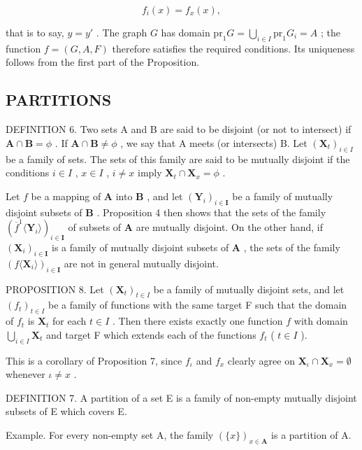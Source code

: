 \[
f _ {i} (x) = f _ {x} (x),
\]

that is to say, \(y = y'\) . The graph \(G\) has domain \(\mathrm{pr}_1 G = \bigcup_{i \in I} \mathrm{pr}_1 G_i = A\) ; the function \(f = (G, A, F)\) therefore satisfies the required conditions. Its uniqueness follows from the first part of the Proposition.

\subsection{PARTITIONS}

DEFINITION 6. Two sets A and B are said to be disjoint (or not to intersect) if \(\mathbf{A} \cap \mathbf{B} = \phi\) . If \(\mathbf{A} \cap \mathbf{B} \neq \phi\) , we say that A meets (or intersects) B. Let \((\mathbf{X}_{t})_{i \in I}\) be a family of sets. The sets of this family are said to be mutually disjoint if the conditions \(i \in I\) , \(x \in I\) , \(i \neq x\) imply \(\mathbf{X}_{t} \cap \mathbf{X}_{x} = \phi\) .

Let \(f\) be a mapping of \(\mathbf{A}\) into \(\mathbf{B}\) , and let \((\mathbf{Y}_i)_{i\in \mathbf{I}}\) be a family of mutually disjoint subsets of \(\mathbf{B}\) . Proposition 4 then shows that the sets of the family \((\overline{f}^1\langle \mathbf{Y}_i\rangle)_{i\in \mathbf{I}}\) of subsets of \(\mathbf{A}\) are mutually disjoint. On the other hand, if \((\mathbf{X}_i)_{i\in \mathbf{I}}\) is a family of mutually disjoint subsets of \(\mathbf{A}\) , the sets of the family \((f\langle \mathbf{X}_i\rangle)_{i\in \mathbf{I}}\) are not in general mutually disjoint.

PROPOSITION 8. Let \((\mathbf{X}_t)_{t \in I}\) be a family of mutually disjoint sets, and let \((f_t)_{t \in I}\) be a family of functions with the same target F such that the domain of \(f_t\) is \(\mathbf{X}_t\) for each \(t \in I\) . Then there exists exactly one function \(f\) with domain \(\bigcup_{i \in I} \mathbf{X}_t\) and target F which extends each of the functions \(f_t\) ( \(t \in I\) ).

This is a corollary of Proposition 7, since \(f_{\iota}\) and \(f_{x}\) clearly agree on \(\mathbf{X}_{\iota} \cap \mathbf{X}_{x} = \emptyset\) whenever \(\iota \neq x\) .

DEFINITION 7. A partition of a set E is a family of non-empty mutually disjoint subsets of E which covers E.

Example. For every non-empty set A, the family \((\{x\})_{x\in\mathbf{A}}\) is a partition of A.

